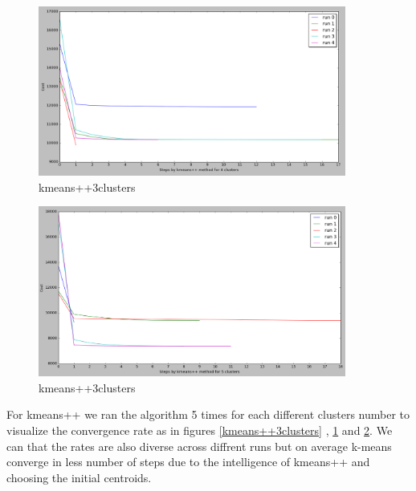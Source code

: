 \begin{figure}[!htb]
\centering
\includegraphics[width=0.9\textwidth]{shots/kmeans++4clusters.png}
\caption{kmeans++3clusters }
\label{kmeans++4clusters}
\end{figure}


\begin{figure}[!htb]
\centering
\includegraphics[width=0.9\textwidth]{shots/kmeans++5clusters.png}
\caption{ kmeans++3clusters}
\label{kmeans++5clusters}
\end{figure}
  

For kmeans++ we ran the algorithm 5 times for each different clusters number to visualize the convergence rate as in figures \ref{kmeans++3clusters} , \ref{kmeans++4clusters} and \ref{kmeans++5clusters}. We can that the rates are also diverse across diffrent runs but on average k-means converge in less number of steps due to the intelligence of kmeans++ and choosing the initial centroids. 















